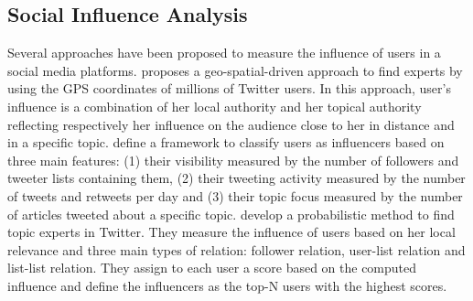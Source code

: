 \subsection{Social Influence Analysis}
Several approaches have been proposed 
to measure the influence of users in a social media platforms.
\cite{Cheng2014} proposes a geo-spatial-driven approach to find experts 
by using the GPS coordinates of millions of Twitter users. In this approach, user's influence
is a combination of her local authority and her topical authority reflecting respectively
her influence on the audience close to her in distance and in a specific topic.
\cite{Lehmann2013} define a framework to classify users as influencers 
based on three main features: (1) their visibility measured by the number of followers and tweeter
lists containing them, (2) their tweeting activity measured by the number of tweets and retweets 
per day and (3) their topic focus measured by the number of articles tweeted 
about a specific topic. 
\cite{wei2016learning} develop a probabilistic method to find topic experts in Twitter. They
measure the influence of users based on her local relevance and three main types of relation: 
follower relation, user-list relation and list-list relation. 
They assign to each user a score based on the computed influence and
define the influencers as the top-N users with the highest scores.
